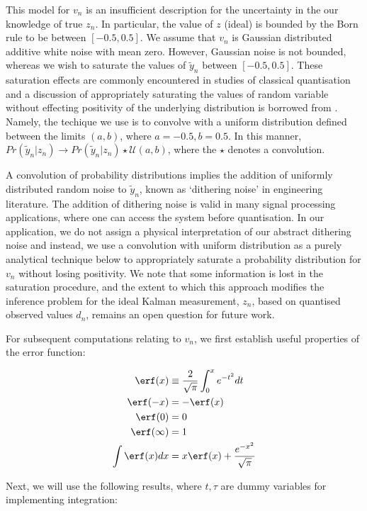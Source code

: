 This model for $v_n$ is an insufficient description for  the uncertainty in the our knowledge of true $z_n$. In particular, the value of $z$ (ideal) is bounded by the Born rule to be between $[-0.5, 0.5]$. We assume that $v_n$ is Gaussian distributed additive white noise with mean zero. However, Gaussian noise is not bounded, whereas we wish to saturate the values of $\tilde{y}_n$ between $[-0.5, 0.5]$. These saturation effects are commonly encountered in studies of classical quantisation and a discussion of appropriately saturating the values of random variable without effecting positivity of the underlying distribution is borrowed from \cite{widrow1996}. Namely, the techique we use is to convolve with a uniform distribution defined between the limits $(a,b)$, where $a=-0.5, b=0.5$. In this manner, $Pr( \tilde{y}_n | z_n) \to Pr( \tilde{y}_n | z_n) \star \mathcal{U}(a,b)$, where the $\star$ denotes a convolution. 

A convolution of probability distributions implies the addition of uniformly distributed random noise to $\tilde{y}_n$, known as `dithering noise' in engineering literature. The addition of dithering noise is valid in many signal processing applications, where one can access the system before quantisation. In our application, we do not assign a physical interpretation of our abstract dithering noise and instead, we use a convolution with uniform distribution  as a purely analytical technique below to appropriately saturate a probability distribution for $v_n$ without losing positivity.  We note that some information is lost in the saturation procedure, and the extent to which this approach modifies the inference problem for the ideal Kalman measurement, $z_n$, based on quantised observed values $d_n$, remains an open question for future work.  

For subsequent computations relating to $v_n$, we first establish useful properties of the error function:

\begin{align}
\erf(x) & \equiv \frac{2}{\sqrt{\pi}} \int_0^{x} e^{-t^2} dt \\
\erf(-x) & = - \erf(x) \\
\erf(0) & = 0 \\
\erf(\infty) & = 1  \label{sec:app:qkf:errfunc_diverge}\\
\int \erf(x) dx & = x \erf(x) + \frac{e^{-x^2}}{\sqrt{\pi}} 
\end{align}

Next, we will use the following results, where $t, \tau$ are dummy variables for implementing integration:

